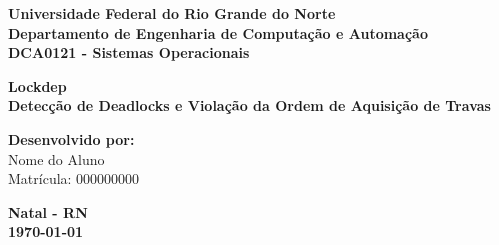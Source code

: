 \begin{titlepage}
    \centering
    \vspace*{1cm}

    \textbf{\LARGE Universidade Federal do Rio Grande do Norte}\\
    \textbf{\large Departamento de Engenharia de Computação e Automação}\\
    \textbf{\large DCA0121 - Sistemas Operacionais}\\
    \vspace{1.5cm}

    \textbf{\Huge Lockdep}\\
    \vspace{0.5cm}
    \textbf{\Large Detecção de Deadlocks e Violação da Ordem de Aquisição de Travas}\\
    \vspace{1.5cm}

    \begin{figure}[h]
        \centering
    \end{figure}

    \vspace{1.5cm}

    \begin{flushright}
        \textbf{Desenvolvido por:}\\
        Nome do Aluno\\
        Matrícula: 000000000
    \end{flushright}

    \vfill

    \textbf{\large Natal - RN}\\
    \textbf{\large \today}

\end{titlepage}
